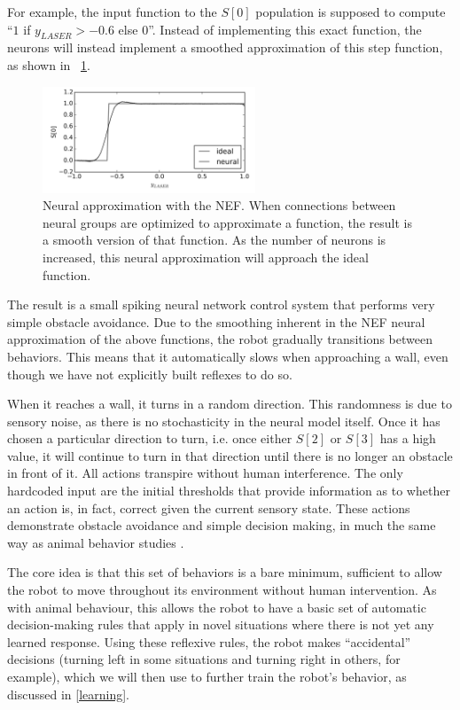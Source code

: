 \documentclass{frontiersSCNS}
\begin{document}
For example, the input function to 
the $S[0]$ population is supposed to compute ``$1$ if $y_{LASER} > -0.6$ else $0$''. 
Instead of implementing this exact function, the neurons will instead implement
a smoothed approximation of this step function, as shown in
\figurename~\ref{NEF}.

\begin{figure}[!t]
\centering
\includegraphics[width=2.5in]{../figures/smoothing.png}
\caption{Neural approximation with the NEF. When connections between neural groups are optimized to approximate a function, the result is a smooth version of that function. As the number of neurons is increased, this neural approximation will approach the ideal function.}
\label{NEF}
\end{figure}

The result is a small spiking neural network control system that performs very 
simple obstacle avoidance. Due to the smoothing inherent in the NEF neural 
approximation of the above functions, the robot gradually transitions between 
behaviors. This means that it automatically slows when approaching a wall, 
even though we have not explicitly built reflexes to do so.  

When it reaches a wall, it turns in a random direction. This randomness is due 
to sensory noise, as there is no stochasticity in the neural model 
itself. Once it has chosen a particular direction to turn, i.e. once 
either $S[2]$ or $S[3]$ has a high value, it will continue to turn in that 
direction until there is no longer an obstacle in front of it. All actions 
transpire without human interference. The only hardcoded input are the initial 
thresholds that provide information as to whether an action is, in fact, 
correct given the current sensory state. These actions demonstrate obstacle 
avoidance and simple decision making, in much the same way as animal behavior 
studies \citep{kim2007encoding}. 

The core idea is that this set of behaviors is a bare minimum, sufficient to
allow the robot to move throughout its environment without human intervention.
As with animal behaviour, this allows the robot to have a basic set of automatic
decision-making rules that apply in novel situations where there is not yet
any learned response.  Using these reflexive rules, the robot makes ``accidental''
decisions (turning left in some situations and turning right in others, for
example), which we will then use to further train the robot's behavior, as
discussed in \ref{learning}.
\end{document}
